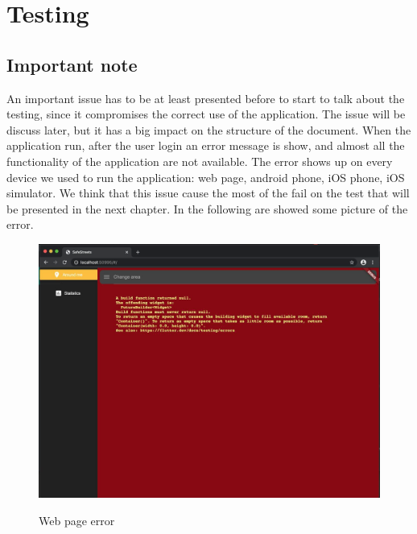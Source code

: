 \documentclass[../ATD.tex]{subfiles}
\begin{document}
    \chapter{Testing}\label{ch:testing}
    \section{Important note}\label{sec:important-note}
    An important issue has to be at least presented before to start to talk about the testing, since it compromises the correct use of the application.
    The issue will be discuss later, but it has a big impact on the structure of the document.
    \newline
    When the application run, after the user login an error message is show, and almost all the functionality of the application are not available.
    The error shows up on every device we used to run the application: web page, android phone, iOS phone, iOS simulator.
    We think that this issue cause the most of the fail on the test that will be presented in the next chapter.
    In the following are showed some picture of the error.

    \begin{figure}[H]
        \centering
        \includegraphics[scale = 0.4]{assets/web_page_error.png}\\
        \caption[Web page error, \textit{Error}]{Web page error}
    \end{figure}
\end{document}
